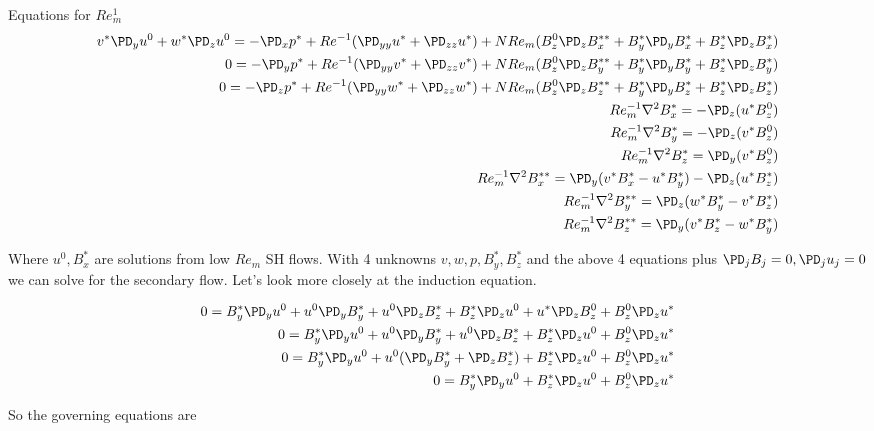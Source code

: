\documentclass[11pt]{article}
\begin{document}
Equations for $Re_m^1$
\begin{equation}\begin{aligned}
v^* \PD_y u^0 + w^* \PD_z u^0 = -\PD_x p^*+ Re^{-1} (\PD_{yy} u^* + \PD_{zz} u^*) + N Re_m (B_z^0 \PD_z B_x^{**} + B_y^* \PD_y B_x^* + B_z^* \PD_z B_x^* ) \\
0                             = -\PD_y p^*+ Re^{-1} (\PD_{yy} v^* + \PD_{zz} v^*) + N Re_m (B_z^0 \PD_z B_y^{**} + B_y^* \PD_y B_y^* + B_z^* \PD_z B_y^* ) \\
0                             = -\PD_z p^*+ Re^{-1} (\PD_{yy} w^* + \PD_{zz} w^*) + N Re_m (B_z^0 \PD_z B_z^{**} + B_y^* \PD_y B_z^* + B_z^* \PD_z B_z^* ) \\
Re_m^{-1} \nabla^2 B_x^{*}  =-\PD_z (u^* B_z^{0}) \\
Re_m^{-1} \nabla^2 B_y^{*}  =-\PD_z (v^* B_z^{0}) \\
Re_m^{-1} \nabla^2 B_z^{*}  = \PD_y (v^* B_z^{0}) \\
Re_m^{-1} \nabla^2 B_x^{**} = \PD_y (v^* B_x^{*} - u^* B_y^{*}) - \PD_z (u^* B_z^{*}) \\
Re_m^{-1} \nabla^2 B_y^{**} = \PD_z (w^* B_y^{*} - v^* B_z^{*}) \\
Re_m^{-1} \nabla^2 B_z^{**} = \PD_y (v^* B_z^{*} - w^* B_y^{*}) \\
\end{aligned}\end{equation}

Where $u^0, B_x^*$ are solutions from low $Re_m$ SH flows. With 4 unknowns $v,w,p,B_y^*,B_z^*$ and the above 4 equations
plus $\PD_j B_j = 0, \PD_j u_j = 0$ we can solve for the secondary flow. Let's look more closely at the induction equation.

\begin{equation}\begin{aligned}
0 =  B_y^{*} \PD_y u^0 + u^0 \PD_y B_y^{*} + u^0 \PD_z B_z^{*} + B_z^{*} \PD_z u^0 + u^* \PD_z B_z^0 + B_z^0 \PD_z u^* \\
0 =  B_y^{*} \PD_y u^0 + u^0 \PD_y B_y^{*} + u^0 \PD_z B_z^{*} + B_z^{*} \PD_z u^0 + B_z^0 \PD_z u^* \\
0 =  B_y^{*} \PD_y u^0 + u^0 (\PD_y B_y^{*} + \PD_z B_z^{*}) + B_z^{*} \PD_z u^0 + B_z^0 \PD_z u^* \\
0 =  B_y^{*} \PD_y u^0 + B_z^{*} \PD_z u^0 + B_z^0 \PD_z u^* \\
\end{aligned}\end{equation}

So the governing equations are
\end{document}
